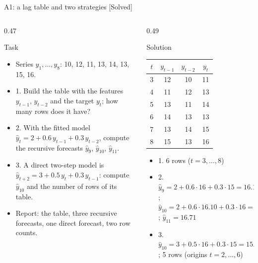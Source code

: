 \begin{frame}{A1: a lag table and two strategies [Solved]}
\itemsize{\scriptsize}
\begin{columns}[T]
\begin{column}{0.47\textwidth}
\begin{block}{Task}
\begin{itemize}
    \item Series $y_1, \dots, y_8$: 10, 12, 11, 13, 14, 13, 15, 16.
    \item 1. Build the table with the features $y_{t-1}$, $y_{t-2}$ and the target $y_t$; how many rows does it have?
    \item 2. With the fitted model $\hat y_t = 2 + 0.6\,y_{t-1} + 0.3\,y_{t-2}$, compute the recursive forecasts $\hat y_9$, $\hat y_{10}$, $\hat y_{11}$.
    \item 3. A direct two-step model is $\hat y_{t+2} = 3 + 0.5\,y_t + 0.3\,y_{t-1}$: compute $\hat y_{10}$ and the number of rows of its table.
    \item Report: the table, three recursive forecasts, one direct forecast, two row counts.
\end{itemize}
\end{block}
\end{column}
\begin{column}{0.49\textwidth}
\begin{exampleblock}{Solution}
\begin{center}
\scriptsize
\begin{tabular}{cccc}
\toprule
$t$ & $y_{t-1}$ & $y_{t-2}$ & $y_t$ \\
\midrule
3 & 12 & 10 & 11 \\
4 & 11 & 12 & 13 \\
5 & 13 & 11 & 14 \\
6 & 14 & 13 & 13 \\
7 & 13 & 14 & 15 \\
8 & 15 & 13 & 16 \\
\bottomrule
\end{tabular}
\end{center}
\begin{itemize}
    \item 1. 6 rows ($t = 3, \dots, 8$)
    \item 2. $\hat y_9 = 2 + 0.6 \cdot 16 + 0.3 \cdot 15 = 16.10$; $\hat y_{10} = 2 + 0.6 \cdot 16.10 + 0.3 \cdot 16 = 16.46$; $\hat y_{11} = 16.71$
    \item 3. $\hat y_{10} = 3 + 0.5 \cdot 16 + 0.3 \cdot 15 = 15.50$; 5 rows (origins $t = 2, \dots, 6$)
\end{itemize}
\end{exampleblock}
\end{column}
\end{columns}
\end{frame}

